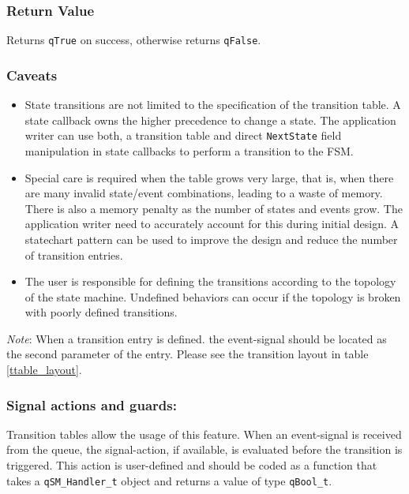 \subsubsection*{Return Value}
Returns \lstinline{qTrue} on success, otherwise returns \lstinline{qFalse}.

\hrulefill

\subsubsection*{Caveats}
\begin{itemize}
    \item State transitions are not limited to the specification of the transition table. A state callback owns the higher precedence to change a state. The application writer can use both, a transition table and direct \lstinline{NextState} field manipulation in state callbacks to perform a transition to the FSM.
    \item Special care is required when the table grows very large, that is, when there are many invalid state/event combinations, leading to a waste of memory. There is also a memory penalty as the number of states and events grow. The application writer  need to accurately account for this during initial design. A statechart pattern can be used to improve the design and reduce the number of transition entries. 
    \item The user is responsible for defining the transitions according to the topology of the state machine. Undefined behaviors can occur if the topology is broken with poorly defined transitions.
\end{itemize}


\begin{tcolorbox}
\ArrowBoldDownRight \textit{Note}: When a transition entry is defined. the event-signal should be located as the second parameter of the entry. Please see the transition layout in table \ref{ttable_layout}.
\end{tcolorbox}

\subsubsection{Signal actions and guards:} 
Transition tables allow the usage of this feature. When an event-signal is received from the queue, the signal-action, if available, is evaluated before the transition is triggered. This action is user-defined and should be coded as a function that takes a \lstinline{qSM_Handler_t} object and returns a value of type \lstinline{qBool_t}. 
\medskip

